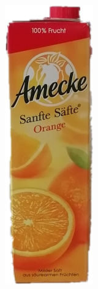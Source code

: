 \begin{figure}[htb]
\begin{minipage}[c]{0.08\textwidth}
\includegraphics[width=\textwidth]{Sources/Bild1.png}

\end{minipage}
\end{figure}
